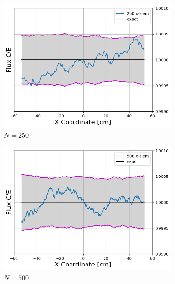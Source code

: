 \documentclass[letterpaper]{mc2023}
\begin{document}
\begin{figure}[H]
\begin{subfigure}{0.405\textwidth}
        \includegraphics[width=\linewidth]{figures/250_flux_CE_error_bars}
        \caption{$N=250$}
        \label{fig:s3}
    \end{subfigure}
    \begin{subfigure}{0.405\textwidth}
        \includegraphics[width=\linewidth]{figures/500_flux_CE_error_bars}
        \caption{$N=500$}
        \label{fig:s4}
    \end{subfigure}
    \par\bigskip
    \begin{subfigure}{0.405\textwidth}

\end{subfigure}
\end{figure}
\end{document}
